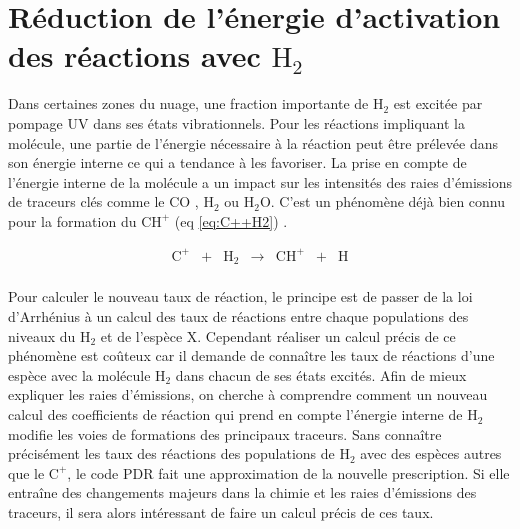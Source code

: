 
\section{Réduction de l'énergie d'activation des réactions avec $\mathrm{H}_2$}


Dans certaines zones du nuage, une fraction importante de $\mathrm{H}_2$ est excitée par pompage UV dans ses états vibrationnels. Pour les réactions impliquant la molécule, une partie de l'énergie nécessaire à la réaction peut être prélevée dans son énergie interne ce qui a tendance à les favoriser. La prise en compte de l'énergie interne de la molécule a un impact sur les intensités des raies d'émissions de traceurs clés comme le $\mathrm{CO}$ \cite{COJoblin}, $\mathrm{H}_2$ ou $\mathrm{H}_2\mathrm{O}$. C'est un phénomène déjà bien connu pour la formation du $\mathrm{CH}^+$ (eq \ref{eq:C++H2}) \cite{Herraez, Zanchet}.

\begin{equation} \label{eq:C++H2}
    \begin{array}{lllclll}
        \mathrm{C}^+ & + &\mathrm{H}_2   & \rightarrow &\mathrm{CH}^+  & + & \mathrm{H} \\
    \end{array}
\end{equation}

Pour calculer le nouveau taux de réaction, le principe est de passer de la loi d'Arrhénius à un calcul des taux de réactions entre chaque populations des niveaux du $\mathrm{H}_2$ et de l'espèce $\mathrm{X}$. Cependant réaliser un calcul précis de ce phénomène est coûteux car il demande de connaître les taux de réactions d'une espèce avec la molécule $\mathrm{H}_2$ dans chacun de ses états excités. Afin de mieux expliquer les raies d'émissions, on cherche à comprendre comment un nouveau calcul des coefficients de réaction qui prend en compte l'énergie interne de $\mathrm{H}_2$ modifie les voies de formations des principaux traceurs. Sans connaître précisément les taux des réactions des populations de $\mathrm{H}_2$ avec 
des espèces autres que le $\mathrm{C}^+$, le code PDR fait une approximation de la nouvelle prescription. Si elle entraîne des changements majeurs dans la chimie et les raies d'émissions des traceurs, il sera alors intéressant de faire un calcul précis de ces taux. \newline 

